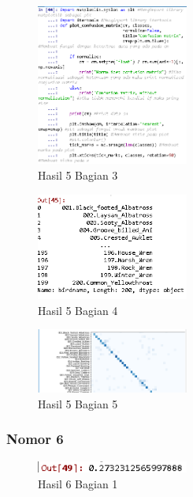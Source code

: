 
\begin{figure}[H]
\centerline{\includegraphics[width=5cm]{figures/1174089/3/praktek23.PNG}}
\caption{Hasil 5 Bagian 3}
\label{labelgambar}
\end{figure}


\begin{figure}[H]
\centerline{\includegraphics[width=5cm]{figures/1174089/3/praktek24.PNG}}
\caption{Hasil 5 Bagian 4}
\label{labelgambar}
\end{figure}


\begin{figure}[H]
\centerline{\includegraphics[width=5cm]{figures/1174089/3/praktek25.PNG}}
\caption{Hasil 5 Bagian 5}
\label{labelgambar}
\end{figure}

\subsubsection{Nomor 6}
\hfill\break

\begin{figure}[H]
\centerline{\includegraphics[width=5cm]{figures/1174089/3/praktek26.PNG}}
\caption{Hasil 6 Bagian 1}
\label{labelgambar}
\end{figure}

